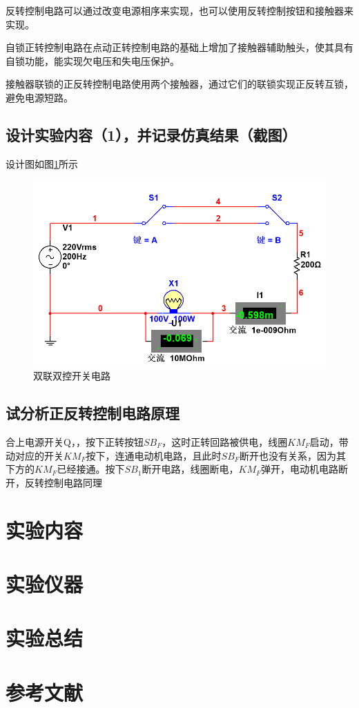 \documentclass{ctexart}
\begin{document}
反转控制电路可以通过改变电源相序来实现，也可以使用反转控制按钮和接触器来实现。

自锁正转控制电路在点动正转控制电路的基础上增加了接触器辅助触头，使其具有自锁功能，能实现欠电压和失电压保护。

接触器联锁的正反转控制电路使用两个接触器，通过它们的联锁实现正反转互锁，避免电源短路。
\subsection{设计实验内容（1），并记录仿真结果（截图）}
设计图如图\ref{fig:双联双控开关电路}所示
\begin{figure}[!ht]
    \centering
    \includegraphics{pic/双联双控开关电路.png}
    \caption{双联双控开关电路}
    \label{fig:双联双控开关电路}
\end{figure}
\subsection{试分析正反转控制电路原理}
合上电源开关Q，，按下正转按钮$SB_F$，这时正转回路被供电，线圈$KM_F$启动，带动对应的开关$KM_F$按下，连通电动机电路，且此时$SB_F$断开也没有关系，因为其下方的$KM_F$已经接通。按下$SB_1$断开电路，线圈断电，$KM_F$弹开，电动机电路断开，反转控制电路同理
\section{实验内容}
\section{实验仪器}
\section{实验总结}
\section{参考文献}
\end{document}
